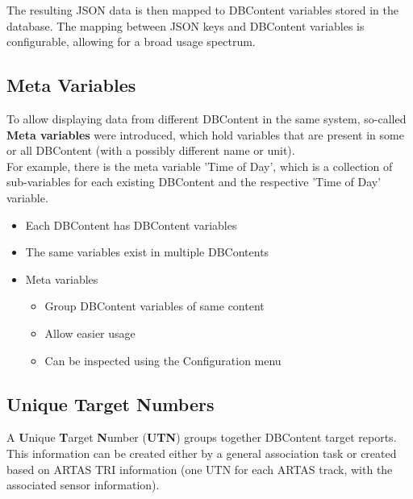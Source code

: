 The resulting JSON data is then mapped to DBContent variables stored in the database. The mapping between JSON keys and DBContent variables is configurable, allowing for a broad usage spectrum.


\subsection*{Meta Variables}

To allow displaying data from different DBContent in the same system, so-called \textbf{Meta variables} were introduced, which hold variables that are present in some or all DBContent (with a possibly different name or unit). \\
For example, there is the meta variable 'Time of Day', which is a collection of sub-variables for each existing DBContent and the respective 'Time of Day' variable. \\

\begin{itemize}
\item Each DBContent has DBContent variables
\item The same variables exist in multiple DBContents
\item Meta variables
\begin{itemize}
\item Group DBContent variables of same content
\item Allow easier usage
\item Can be inspected using the Configuration menu
\end{itemize}
\end{itemize}

\subsection*{Unique Target Numbers}
A \textbf{U}nique \textbf{T}arget \textbf{N}umber (\textbf{UTN}) groups together DBContent target reports.
This information can be created either by a general association task or created based on ARTAS TRI information (one UTN for each ARTAS track, with the associated sensor information). \\

